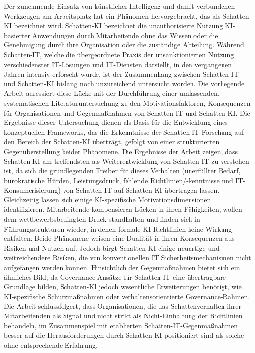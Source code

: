 \documentclass[12pt,oneside]{article}
\begin{document}
Der zunehmende Einsatz von künstlicher Intelligenz und damit verbundenen Werkzeugen am Arbeitsplatz hat ein Phänomen hervorgebracht, das als Schatten-KI bezeichnet wird. Schatten-KI bezeichnet die unauthorisierte Nutzung KI-basierter Anwendungen durch Mitarbeitende ohne das Wissen oder die Genehmigung durch ihre Organisation oder die zuständige Abteilung. Während Schatten-IT, welche die übergeordnete Praxis der unsanktionierten Nutzung verschiedenster IT-Lösungen und IT-Diensten darstellt, in den vergangenen Jahren intensiv erforscht wurde, ist der Zusammenhang zwischen Schatten-IT und Schatten-KI bislang noch unzureichend untersucht worden. Die vorliegende Arbeit adressiert diese Lücke mit der Durchführung einer umfassenden, systematischen Literaturuntersuchung zu den Motivationsfaktoren, Konsequenzen für Organisationen und Gegenmaßnahmen von Schatten-IT und Schatten-KI. Die Ergebnisse dieser Untersuchung dienen als Basis für die Entwicklung eines konzeptuellen Frameworks, das die Erkenntnisse der Schatten-IT-Forschung auf den Bereich der Schatten-KI überträgt, gefolgt von einer strukturierten Gegenüberstellung beider Phänomene. Die Ergebnisse der Arbeit zeigen, dass Schatten-KI am treffendsten als Weiterentwicklung von Schatten-IT zu verstehen ist, da sich die grundlegenden Treiber für dieses Verhalten (unerfüllter Bedarf, bürokratische Hürden, Leistungsdruck, fehlende Richtlinien/-kenntnisse und IT-Konsumerisierung) von Schatten-IT auf Schatten-KI übertragen lassen. Gleichzeitig lassen sich einige KI-spezifische Motivationsdimensionen identifizieren. Mitarbeitende kompensieren Lücken in ihren Fähigkeiten, wollen dem wettbewerbsbedingten Druck standhalten und finden sich in Führungsstrukturen wieder, in denen formale KI-Richtlinien keine Wirkung entfalten. Beide Phänomene weisen eine Dualität in ihren Konsequenzen aus Risiken und Nutzen auf. Jedoch birgt Schatten-KI einige neuartige und weitreichendere Risiken, die von konventionellen IT Sicherheitsmechanismen nicht aufgefangen werden können. Hinsichtlich der Gegenmaßnahmen bietet sich ein ähnliches Bild, da Governance-Ansätze für Schatten-IT eine übertragbare Grundlage bilden, Schatten-KI jedoch wesentliche Erweiterungen benötigt, wie KI-spezifische Schutzmaßnahmen oder verhaltensorientierte Governance-Rahmen. Die Arbeit schlussfolgert, dass Organisationen, die das Schattenverhalten ihrer Mitarbeitenden als Signal und nicht strikt als Nicht-Einhaltung der Richtlinien behandeln, im Zusammenspiel mit etablierten Schatten-IT-Gegenmaßnahmen besser auf die Herausforderungen durch Schatten-KI positioniert sind als solche ohne entsprechende Erfahrung.
\end{document}

